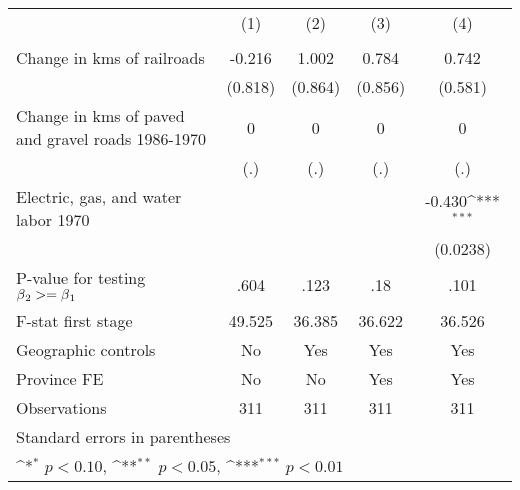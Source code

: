 {
\def\sym#1{\ifmmode^{#1}\else\(^{#1}\)\fi}
\begin{tabular}{l*{4}{c}}
\hline\hline
                &\multicolumn{1}{c}{(1)}&\multicolumn{1}{c}{(2)}&\multicolumn{1}{c}{(3)}&\multicolumn{1}{c}{(4)}\\
                &\multicolumn{1}{c}{}&\multicolumn{1}{c}{}&\multicolumn{1}{c}{}&\multicolumn{1}{c}{}\\
\hline
Change in kms of railroads&   -0.216         &    1.002         &    0.784         &    0.742         \\
                &  (0.818)         &  (0.864)         &  (0.856)         &  (0.581)         \\
[1em]
Change in kms of paved and gravel roads 1986-1970&        0         &        0         &        0         &        0         \\
                &      (.)         &      (.)         &      (.)         &      (.)         \\
[1em]
Electric, gas, and water labor 1970&                  &                  &                  &   -0.430\sym{***}\\
                &                  &                  &                  & (0.0238)         \\
\hline
P-value for testing $\beta\\_2 >= \beta\\_1$&     .604         &     .123         &      .18         &     .101         \\
F-stat first stage&   49.525         &   36.385         &   36.622         &   36.526         \\
Geographic controls&       No         &      Yes         &      Yes         &      Yes         \\
Province FE     &       No         &       No         &      Yes         &      Yes         \\
Observations    &      311         &      311         &      311         &      311         \\
\hline\hline
\multicolumn{5}{l}{\footnotesize Standard errors in parentheses}\\
\multicolumn{5}{l}{\footnotesize \sym{*} \(p<0.10\), \sym{**} \(p<0.05\), \sym{***} \(p<0.01\)}\\
\end{tabular}
}
